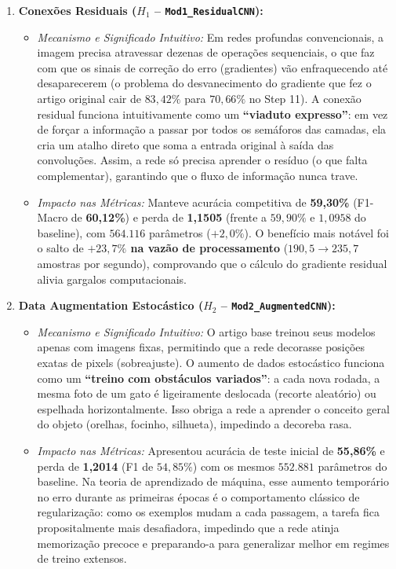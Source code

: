 \documentclass[runningheads]{llncs}
\begin{document}
\begin{enumerate}
    \item \textbf{Conex\~{o}es Residuais ($H_1$ -- \texttt{Mod1\_ResidualCNN}):}
    \begin{itemize}
        \item \textit{Mecanismo e Significado Intuitivo:} Em redes profundas convencionais, a imagem precisa atravessar dezenas de opera\c{c}\~{o}es sequenciais, o que faz com que os sinais de corre\c{c}\~{a}o do erro (gradientes) v\~{a}o enfraquecendo at\'{e} desaparecerem (o problema do desvanecimento do gradiente que fez o artigo original cair de $83{,}42\%$ para $70{,}66\%$ no Step 11). A conex\~{a}o residual funciona intuitivamente como um \textbf{``viaduto expresso''}: em vez de for\c{c}ar a informa\c{c}\~{a}o a passar por todos os sem\'{a}foros das camadas, ela cria um atalho direto que soma a entrada original \`{a} sa\'{i}da das convolu\c{c}\~{o}es. Assim, a rede s\'{o} precisa aprender o res\'{i}duo (o que falta complementar), garantindo que o fluxo de informa\c{c}\~{a}o nunca trave.
        \item \textit{Impacto nas M\'{e}tricas:} Manteve acur\'{a}cia competitiva de \textbf{59,30\%} (F1-Macro de \textbf{60,12\%}) e perda de \textbf{1,1505} (frente a $59{,}90\%$ e $1{,}0958$ do baseline), com $564.116$ par\^{a}metros ($+2{,}0\%$). O benef\'{i}cio mais not\'{a}vel foi o salto de \textbf{$+23{,}7\%$ na vaz\~{a}o de processamento} ($190{,}5 \to 235{,}7$ amostras por segundo), comprovando que o c\'{a}lculo do gradiente residual alivia gargalos computacionais.
    \end{itemize}

    \item \textbf{Data Augmentation Estoc\'{a}stico ($H_2$ -- \texttt{Mod2\_AugmentedCNN}):}
    \begin{itemize}
        \item \textit{Mecanismo e Significado Intuitivo:} O artigo base treinou seus modelos apenas com imagens fixas, permitindo que a rede decorasse posi\c{c}\~{o}es exatas de pixels (sobreajuste). O aumento de dados estoc\'{a}stico funciona como um \textbf{``treino com obst\'{a}culos variados''}: a cada nova rodada, a mesma foto de um gato \'{e} ligeiramente deslocada (recorte aleat\'{o}rio) ou espelhada horizontalmente. Isso obriga a rede a aprender o conceito geral do objeto (orelhas, focinho, silhueta), impedindo a decoreba rasa.
        \item \textit{Impacto nas M\'{e}tricas:} Apresentou acur\'{a}cia de teste inicial de \textbf{55,86\%} e perda de \textbf{1,2014} (F1 de $54{,}85\%$) com os mesmos $552.881$ par\^{a}metros do baseline. Na teoria de aprendizado de m\'{a}quina, esse aumento tempor\'{a}rio no erro durante as primeiras \'{e}pocas \'{e} o comportamento cl\'{a}ssico de regulariza\c{c}\~{a}o: como os exemplos mudam a cada passagem, a tarefa fica propositalmente mais desafiadora, impedindo que a rede atinja memoriza\c{c}\~{a}o precoce e preparando-a para generalizar melhor em regimes de treino extensos.
    \end{itemize}


\end{enumerate}
\end{document}
